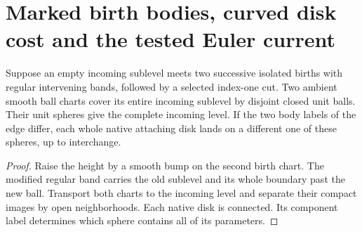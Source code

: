 \section{Marked birth bodies, curved disk cost and the tested Euler current}
\label{sec:ed03-marked-glue}

\begin{theorem}
\label{thm:ed03-birth-survivors}
\leanok
Suppose an empty incoming sublevel meets two successive isolated births with
regular intervening bands, followed by a selected index-one cut. Two ambient
smooth ball charts cover its entire incoming sublevel by disjoint closed
unit balls. Their unit spheres give the complete incoming level. If the two
body labels of the edge differ, each whole native attaching disk lands on a
different one of these spheres, up to interchange.
\end{theorem}
\begin{proof}
\leanok
Raise the height by a smooth bump on the second birth chart. The modified
regular band carries the old sublevel and its whole boundary past the new
ball. Transport both charts to the incoming level and separate their compact
images by open neighborhoods. Each native disk is connected. Its component
label determines which sphere contains all of its parameters.
\end{proof}

